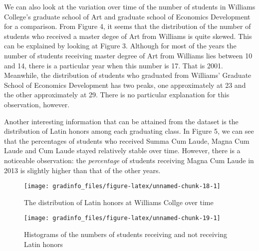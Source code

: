 We can also look at the variation over time of the number of students in
Williams College's graduate school of Art and graduate school of
Economics Development for a comparison. From Figure 4, it seems that the
distribution of the number of students who received a master degee of
Art from Williams is quite skewed. This can be explained by looking at
Figure 3. Although for most of the years the number of students
receiving master degree of Art from Williams lies between 10 and 14,
there is a particular year when this number is 17. That is 2001.
Meanwhile, the distribution of students who graduated from Williams'
Graduate School of Economics Development has two peaks, one
approximately at 23 and the other approximately at 29. There is no
particular explanation for this observation, however.

\newpage

Another interesting information that can be attained from the dataset is
the distribution of Latin honors among each graduating class. In Figure
5, we can see that the percentages of students who received Summa Cum
Laude, Magna Cum Laude and Cum Laude stayed relatively stable over time.
However, there is a noticeable observation: the \emph{percentage} of
students receiving Magna Cum Laude in 2013 is slightly higher than that
of the other years.

\begin{Schunk}
\begin{figure}

{\centering \texttt{[image: gradinfo\_files/figure-latex/unnamed-chunk-18-1]} 

}

\caption[The distribution of Latin honors at Williams Collge over time]{The distribution of Latin honors at Williams Collge over time}\label{fig:unnamed-chunk-18}
\end{figure}
\end{Schunk}\begin{Schunk}
\begin{figure}

{\centering \texttt{[image: gradinfo\_files/figure-latex/unnamed-chunk-19-1]} 

}

\caption[Histograms of the numbers of students receiving and not receiving Latin honors]{Histograms of the numbers of students receiving and not receiving Latin honors}\label{fig:unnamed-chunk-19}
\end{figure}
\end{Schunk}

